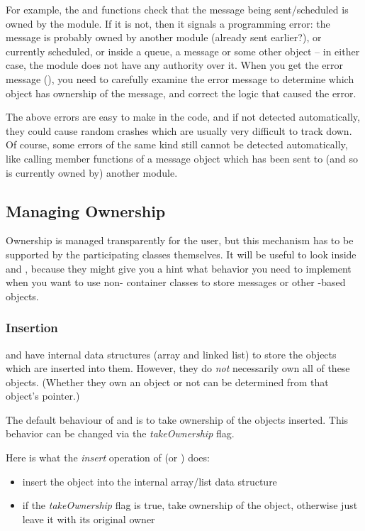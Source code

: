 For example, the  and  functions check
that the message being sent/scheduled is owned by the module.
If it is not, then it signals a programming error: the message is probably
owned by another module (already sent earlier?), or currently scheduled, or
inside a queue, a message or some other object -- in either case, the
module does not have any authority over it. When you get the error message
(), you need to carefully examine the error
message to determine which object has ownership of the message, and correct
the logic that caused the error.

The above errors are easy to make in the code, and if not detected
automatically, they could cause random crashes which are usually very
difficult to track down. Of course, some errors of the same kind still
cannot be detected automatically, like calling member functions of a
message object which has been sent to (and so is currently owned by) another
module.


\subsection{Managing Ownership}

Ownership is managed transparently for the user, but this mechanism
has to be supported by the participating classes themselves.
It will be useful to look inside  and ,
because they might give you a hint what behavior you need
to implement when you want to use non-{\opp} container classes
to store messages or other -based objects.


\subsubsection{Insertion}

 and  have internal data structures
(array and linked list) to store the objects which are inserted
into them. However, they do \textit{not} necessarily own all of these
objects.  (Whether they own an object or not can be determined
from that object's  pointer.)

The default behaviour of  and  is
to take ownership of the objects inserted.
This behavior can be changed via the \textit{takeOwnership} flag.

Here is what the \textit{insert} operation of  (or ) does:
\begin{itemize}
    \item{insert the object into the internal array/list data structure}

    \item{if the \textit{takeOwnership} flag is true, take ownership
    of the object, otherwise just leave it with its original owner}
\end{itemize}

